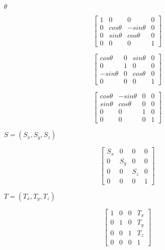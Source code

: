 \documentclass{article}
\begin{document}
$\theta$
\pagebreak

\[ \begin{bmatrix} 1 & 0 & 0 & 0 \\ 0 & cos\theta & -sin\theta & 0 \\ 0 & sin\theta & cos\theta & 0 \\ 0 & 0 & 0 & 1 \end{bmatrix} \]
\pagebreak

\[ \begin{bmatrix} cos\theta & 0 & sin\theta & 0 \\ 0 & 1 & 0 & 0 \\ -sin\theta & 0 & cos\theta & 0 \\ 0 & 0 & 0 & 1 \end{bmatrix} \]
\pagebreak

\[ \begin{bmatrix} cos\theta & -sin\theta & 0 & 0 \\ sin\theta & cos\theta & 0 & 0 \\ 0 & 0 & 1 & 0 \\ 0 & 0 & 0 & 1 \end{bmatrix} \]
\pagebreak

$S=(S_x,S_y,S_z)$
\pagebreak

\[ \begin{bmatrix} S_x & 0 & 0 & 0 \\ 0 & S_y & 0 & 0 \\ 0 & 0 & S_z & 0 \\ 0 & 0 & 0 & 1 \end{bmatrix} \]
\pagebreak

$T=(T_x,T_y,T_z)$
\pagebreak

\[ \begin{bmatrix} 1 & 0 & 0 & T_x \\ 0 & 1 & 0 & T_y \\ 0 & 0 & 1 & T_z \\ 0 & 0 & 0 & 1 \end{bmatrix} \]
\pagebreak
\end{document}
